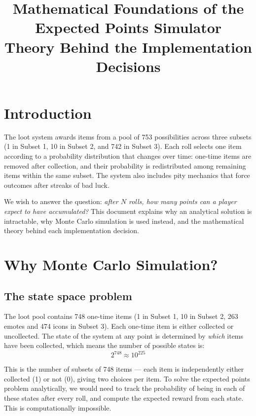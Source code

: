 \documentclass[11pt,a4paper]{article}
\title{\textbf{Mathematical Foundations of the\\Expected Points Simulator}\\[0.3em]
\large Theory Behind the Implementation Decisions}
\author{}
\date{}
\theoremstyle{remark}
\begin{document}
\maketitle
\tableofcontents
\newpage

\section{Introduction}

The loot system awards items from a pool of 753 possibilities across three subsets (1 in Subset 1, 10 in Subset 2, and 742 in Subset 3). Each roll selects one item according to a probability distribution that changes over time: one-time items are removed after collection, and their probability is redistributed among remaining items within the same subset. The system also includes pity mechanics that force outcomes after streaks of bad luck.

We wish to answer the question: \emph{after $N$ rolls, how many points can a player expect to have accumulated?} This document explains why an analytical solution is intractable, why Monte Carlo simulation is used instead, and the mathematical theory behind each implementation decision.

\section{Why Monte Carlo Simulation?}

\subsection{The state space problem}

The loot pool contains 748 one-time items (1 in Subset 1, 10 in Subset 2, 263 emotes and 474 icons in Subset 3). Each one-time item is either collected or uncollected. The state of the system at any point is determined by \emph{which} items have been collected, which means the number of possible states is:
\[
2^{748} \approx 10^{225}
\]

This is the number of subsets of 748 items --- each item is independently either collected (1) or not (0), giving two choices per item. To solve the expected points problem analytically, we would need to track the probability of being in each of these states after every roll, and compute the expected reward from each state. This is computationally impossible.
\end{document}
